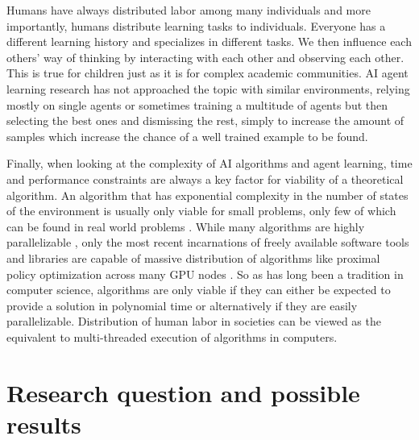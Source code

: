 \documentclass[12pt,a4paper]{article}
\begin{document}
Humans have always distributed labor among many individuals and more importantly, humans distribute learning tasks to individuals. Everyone has a different learning history and specializes in different tasks. We then influence each others' way of thinking by interacting with each other and observing each other. This is true for children just as it is for complex academic communities. AI agent learning research has not approached the topic with similar environments, relying mostly on single agents or sometimes training a multitude of agents but then selecting the best ones and dismissing the rest, simply to increase the amount of samples which increase the chance of a well trained example to be found.


Finally, when looking at the complexity of AI algorithms and agent learning, time and performance constraints are always a key factor for viability of a theoretical algorithm. An algorithm that has exponential complexity in the number of states of the environment is usually only viable for small problems, only few of which can be found in real world problems \cite[p.839f.]{russel2016artificial}. While many algorithms are highly parallelizable \cite{tensorflow2015-whitepaper}, only the most recent incarnations of freely available software tools and libraries are capable of massive distribution of algorithms like proximal policy optimization across many GPU nodes \cite{hafner2017agents}. So as has long been a tradition in computer science, algorithms are only viable if they can either be expected to provide a solution in polynomial time or alternatively if they are easily parallelizable. Distribution of human labor in societies can be viewed as the equivalent to multi-threaded execution of algorithms in computers.

\section{Research question and possible results}
\end{document}
